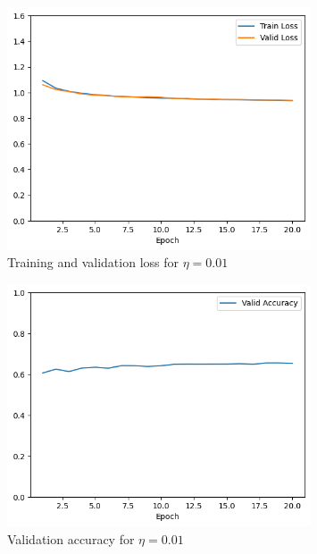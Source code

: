 \documentclass{article}
\begin{document}
\begin{figure}[H]
    \centering
    \includegraphics[width=0.8\textwidth]{"plots/logistic_regression-training-loss-batch-16-lr-0.01-epochs-20-l2-0-opt-sgd.png"}
    \caption{Training and validation loss for $\eta = 0.01$}
    \label{2.1 0.01 Loss Plot}
\end{figure}

\begin{figure}[H]
    \centering
    \includegraphics[width=0.8\textwidth]{"plots/logistic_regression-validation-accuracy-batch-16-lr-0.01-epochs-20-l2-0-opt-sgd.png"}
    \caption{Validation accuracy for $\eta = 0.01$}
    \label{2.1 0.01 Acc Plot}
\end{figure}
\end{document}
